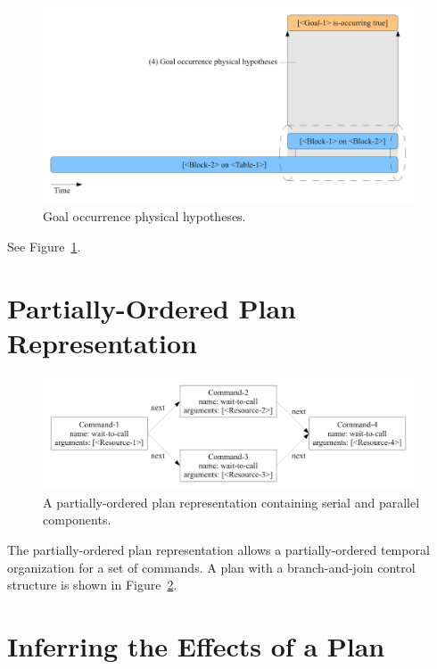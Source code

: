\begin{figure}[bth]
  \center
  \includegraphics[width=11cm]{gfx/learning_to_plan-4-goal_occurrence_physical_hypotheses}
  \caption[Goal occurrence physical hypotheses]{Goal occurrence physical hypotheses.}
  \label{fig:goal_occurrence_physical_hypotheses}
\end{figure}

See Figure~\ref{fig:goal_occurrence_physical_hypotheses}.





\section{Partially-Ordered Plan Representation}

\begin{figure}[bth]
  \center
  \includegraphics[width=11cm]{gfx/serial_and_parallel_plan}
  \caption[A partially-ordered plan with serial and parallel
    components]{A partially-ordered plan representation containing
    serial and parallel components.}
  \label{fig:serial_and_parallel_plan}
\end{figure}

The partially-ordered plan representation allows a partially-ordered
temporal organization for a set of commands.  A plan with a
branch-and-join control structure is shown in
Figure~\ref{fig:serial_and_parallel_plan}.


\section{Inferring the Effects of a Plan}
\label{sec:inferring_the_effects_of_a_plan}

